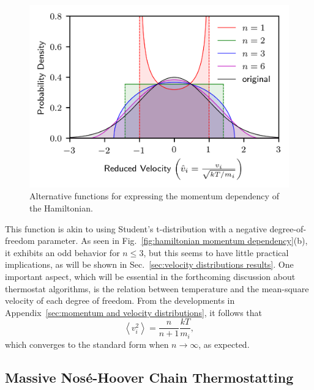 \documentclass[
aip,
jcp,
reprint,
]{revtex4-1}
\begin{document}
\begin{figure}
	\centering
	\includegraphics{velocity_distributions}
	\caption{Alternative functions for expressing the momentum dependency of the Hamiltonian.}
	\label{fig:individual momentum distributions}
\end{figure}

This function is akin to using Student's t-distribution with a negative degree-of-freedom parameter.
As seen in Fig.~\ref{fig:hamiltonian momentum dependency}(b), it exhibits an odd behavior for $n \leq 3$, but this seems to have little practical implications, as will be shown in Sec.~\ref{sec:velocity distributions results}.
One important aspect, which will be essential in the forthcoming discussion about thermostat algorithms, is the relation between temperature and the mean-square velocity of each degree of freedom.
From the developments in Appendix~\ref{sec:momentum and velocity distributions}, it follows that
\begin{equation}
\label{eq:mean-square velocity}
\left\langle v_i^2 \right\rangle = \frac{n}{n+1} \frac{kT}{m_i},
\end{equation}
which converges to the standard form when $n \to \infty$, as expected.

\subsection{Massive Nos\'{e}-Hoover Chain Thermostatting}
\label{sec:massive NHC thermostatting}
\end{document}
